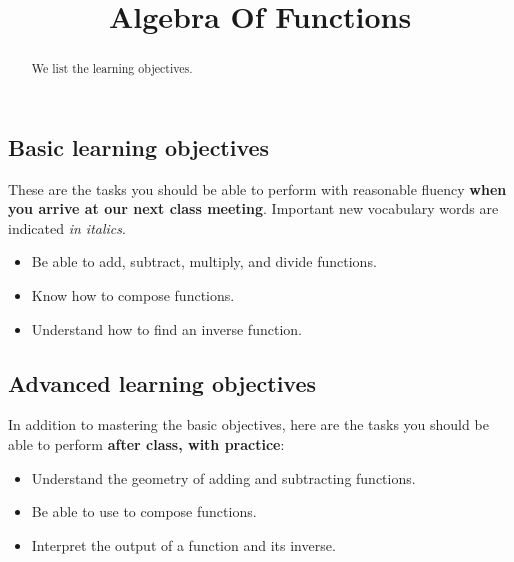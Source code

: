 \documentclass{ximera}
\title{Algebra Of Functions}
\begin{document}
\begin{abstract}
We list the learning objectives.
\end{abstract}
\maketitle

\subsection*{Basic learning objectives}

These are the tasks you should be able to perform with reasonable fluency \textbf{when you arrive at our next class meeting}. Important new vocabulary words are indicated \emph{in italics}. 

\begin{itemize}
	\item Be able to add, subtract, multiply, and divide functions.
	\item Know how to compose functions. 
	\item Understand how to find an inverse function.
\end{itemize}

\subsection*{Advanced learning objectives}

In addition to mastering the basic objectives, here are the tasks you should be able to perform \textbf{after class, with practice}: 

\begin{itemize}
	\item Understand the geometry of adding and subtracting functions.
	\item Be able to use  to compose functions.
	\item Interpret the output of a function and its inverse.
\end{itemize}
\end{document}
